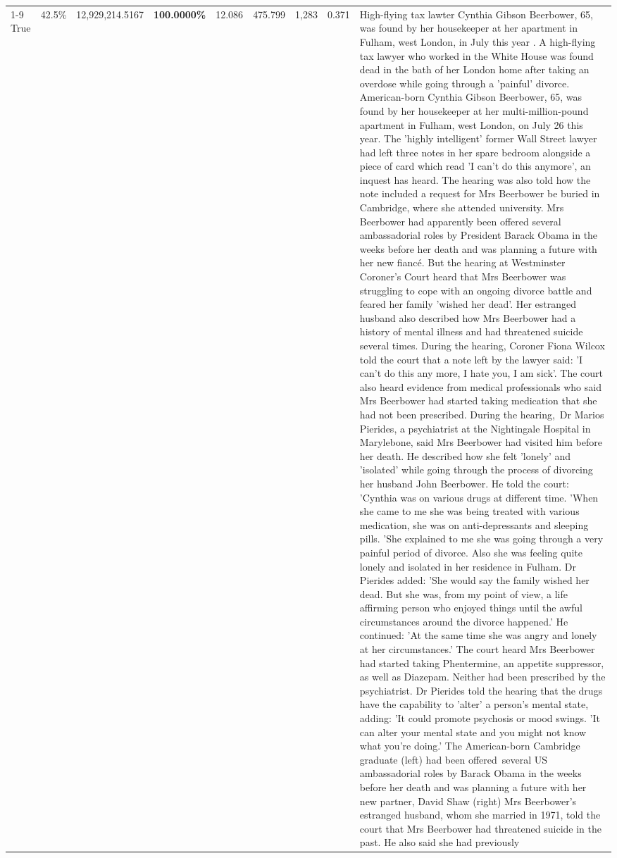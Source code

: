 \begin{table}[H]
\begin{tabular}{lllrlllll}
\cline{1-9}
True & 42.5\% & 12,929,214.5167 & \bfseries \color{red} 100.0000\% & 12.086 & 475.799 & 1,283 & 0.371 & High-flying tax lawter Cynthia Gibson Beerbower, 65, was found by her housekeeper at her apartment in Fulham, west London, in July this year . A high-flying tax lawyer who worked in the White House was found dead in the bath of her London home after taking an overdose while going through a 'painful' divorce. American-born Cynthia Gibson Beerbower, 65, was found by her housekeeper at her multi-million-pound apartment in Fulham, west London, on July 26 this year. The 'highly intelligent' former Wall Street lawyer had left three notes in her spare bedroom alongside a piece of card which read 'I can't do this anymore', an inquest has heard. The hearing was also told how the note included a request for Mrs Beerbower be buried in Cambridge, where she attended university. Mrs Beerbower had apparently been offered several ambassadorial roles by President Barack Obama in the weeks before her death and was planning a future with her new fiancé. But the hearing at Westminster Coroner's Court heard that Mrs Beerbower was struggling to cope with an ongoing divorce battle and feared her family 'wished her dead'. Her estranged husband also described how Mrs Beerbower had a history of mental illness and had threatened suicide several times. During the hearing, Coroner Fiona Wilcox told the court that a note left by the lawyer said: 'I can't do this any more, I hate you, I am sick'. The court also heard evidence from medical professionals who said Mrs Beerbower had started taking medication that she had not been prescribed. During the hearing, Dr Marios Pierides, a psychiatrist at the Nightingale Hospital in Marylebone, said Mrs Beerbower had visited him before her death. He described how she felt 'lonely' and 'isolated' while going through the process of divorcing her husband John Beerbower. He told the court: 'Cynthia was on various drugs at different time. 'When she came to me she was being treated with various medication, she was on anti-depressants and sleeping pills. 'She explained to me she was going through a very painful period of divorce. Also she was feeling quite lonely and isolated in her residence in Fulham. Dr Pierides added: 'She would say the family wished her dead. But she was, from my point of view, a life affirming person who enjoyed things until the awful circumstances around the divorce happened.' He continued: 'At the same time she was angry and lonely at her circumstances.' The court heard Mrs Beerbower had started taking Phentermine, an appetite suppressor, as well as Diazepam. Neither had been prescribed by the psychiatrist. Dr Pierides told the hearing that the drugs have the capability to 'alter' a person's mental state, adding: 'It could promote psychosis or mood swings. 'It can alter your mental state and you might not know what you're doing.' The American-born Cambridge graduate (left) had been offered several US ambassadorial roles by Barack Obama in the weeks before her death and was planning a future with her new partner, David Shaw (right) Mrs Beerbower's estranged husband, whom she married in 1971, told the court that Mrs Beerbower had threatened suicide in the past. He also said she had previously 
\end{tabular}
\end{table}
